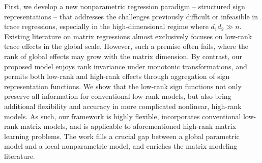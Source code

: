 \documentclass[aos]{imsart}
\theoremstyle{definition}
\begin{document}
First, we develop a new nonparametric regression paradigm -- structured sign representations -- that addresses the challenges previously difficult or infeasible in trace regressions, especially in the high-dimensional regime where $d_1d_2\gg n$. Existing literature on matrix regressions almost exclusively focuses on low-rank trace effects in the global scale. However, such a premise often fails, where the rank of global effects may grow with the matrix dimension. By contrast, our proposed model enjoys rank invariance under monotonic transformations, and permits both low-rank and high-rank effects through aggregation of sign representation functions. We show that the low-rank sign functions not only preserve all information for conventional low-rank models, but also bring additional flexibility and accuracy in more complicated nonlinear, high-rank models. As such, our framework is highly flexible, incorporates conventional low-rank matrix models, and is applicable to aforementioned high-rank matrix learning problems. The work fills a crucial gap between a global parametric model and a local nonparametric model, and enriches the matrix modeling literature. 
\end{document}
